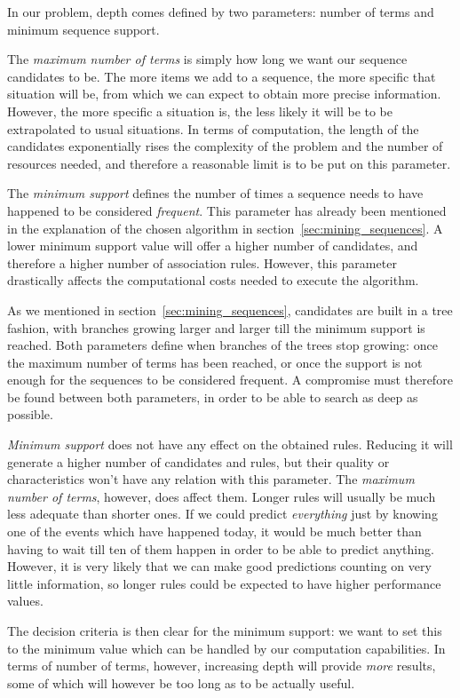 \documentclass[a4paper,12pt]{article}
\begin{document}
In our problem, depth comes defined by two parameters: number of terms and minimum sequence support.

The \emph{maximum number of terms} is simply how long we want our sequence candidates to be. The more items we add to a sequence, the more specific that situation will be, from which we can expect to obtain more precise information. However, the more specific a situation is, the less likely it will be to be extrapolated to usual situations. In terms of computation, the length of the candidates exponentially rises the complexity of the problem and the number of resources needed, and therefore a reasonable limit is to be put on this parameter.

The \emph{minimum support} defines the number of times a sequence needs to have happened to be considered \emph{frequent}. This parameter has already been mentioned in the explanation of the chosen algorithm in section~\ref{sec:mining_sequences}. A lower minimum support value will offer a higher number of candidates, and therefore a higher number of association rules. However, this parameter drastically affects the computational costs needed to execute the algorithm.

As we mentioned in section~\ref{sec:mining_sequences}, candidates are built in a tree fashion, with branches growing larger and larger till the minimum support is reached. Both parameters define when branches of the trees stop growing: once the maximum number of terms has been reached, or once the support is not enough for the sequences to be considered frequent. A compromise must therefore be found between both parameters, in order to be able to search as deep as possible.

\emph{Minimum support} does not have any effect on the obtained rules. Reducing it will generate a higher number of candidates and rules, but their quality or characteristics won't have any relation with this parameter. The \emph{maximum number of terms}, however, does affect them. Longer rules will usually be much less adequate than shorter ones. If we could predict \emph{everything} just by knowing one of the events which have happened today, it would be much better than having to wait till ten of them happen in order to be able to predict anything. However, it is very likely that we can make good predictions counting on very little information, so longer rules could be expected to have higher performance values.

The decision criteria is then clear for the minimum support: we want to set this to the minimum value which can be handled by our computation capabilities. In terms of number of terms, however, increasing depth will provide \emph{more} results, some of which will however be too long as to be actually useful.
\end{document}
